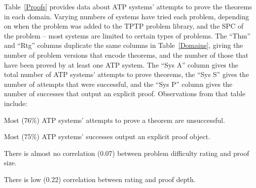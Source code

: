 \documentclass[runningheads]{llncs}
\newenvironment{packed_itemize}{
\vspace*{-0.2em}
\begin{itemize}
\setlength{\partopsep}{0pt}
\setlength{\itemsep}{1pt}
\setlength{\parskip}{0pt}
\setlength{\parsep}{0pt}
}{\end{itemize}}
\begin{document}
Table~\ref{Proofs} provides data about ATP systems' attempts to prove the theorems in each domain.
Varying numbers of systems have tried each problem, depending on when the problem was added to
the TPTP problem library, and the SPC of the problem -- most systems are limited to certain types
of problems.
The ``Thm'' and ``Rtg'' columns duplicate the same columns in Table~\ref{Domains}, giving the
number of problem versions that encode theorems, and the number of those that have been proved
by at least one ATP system.
The ``Sys A'' column gives the total number of ATP systems' attempts to prove theorems, the 
``Sys S'' gives the number of attempts that were successful, and the ``Sys P'' column gives the 
number of successes that output an explicit proof.
Observations from that table include:
\begin{packed_itemize}
\item Most (76\%) ATP systems' attempts to prove a theorem are unsuccessful.
\item Most (75\%) ATP systems' successes output an explicit proof object.
\item There is almost no correlation (0.07) between problem difficulty rating and proof size.
\item There is low (0.22) correlation between rating and proof depth.
\end{packed_itemize}
\end{document}

